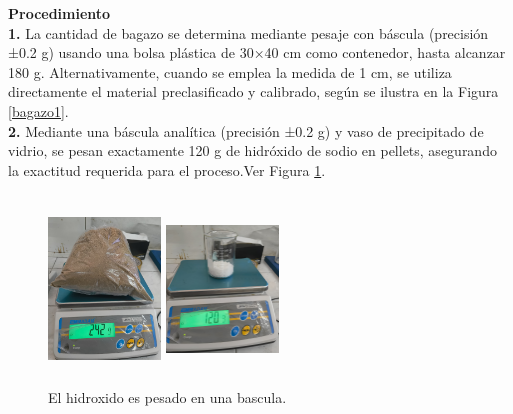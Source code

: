 \documentclass[12pt]{article}
\begin{document}
\textbf{Procedimiento}
\\[0.5em]
	
			\textbf{1.}	La cantidad de bagazo se determina mediante pesaje con báscula (precisión ±0.2 g) usando una bolsa plástica de 30×40 cm como contenedor, hasta alcanzar 180 g. Alternativamente, cuando se emplea la medida de 1 cm, se utiliza directamente el material preclasificado y calibrado, según se ilustra en la Figura \ref{bagazo1}.\\
					
			\textbf{2.} Mediante una báscula analítica (precisión ±0.2 g) y vaso de precipitado de vidrio, se pesan exactamente 120 g de hidróxido de sodio en pellets, asegurando la exactitud requerida para el proceso.Ver Figura \ref{cernir_bagazo_hidroxidopesado}.

			
					\begin{figure}[H]
				\centering
				\begin{minipage}{0.46\textwidth}
					\centering
						\includegraphics[width=3cm, height=5cm]{imagenes/pesado4}
					\caption{Bagazo de 1 cm.}
					\label{bagazo1}
				\end{minipage}
				\hfill
				\begin{minipage}{0.48\textwidth}
					\centering
						\includegraphics[width=3cm, height=5cm]{imagenes/hidroxido_pesado}
					\caption{El hidroxido es pesado en una bascula.}
					\label{cernir_bagazo_hidroxidopesado}
				\end{minipage}
			\end{figure}
			
\end{document}
